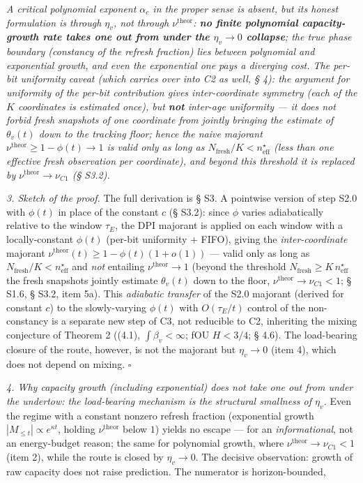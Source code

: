 \documentclass[12pt]{iopart}
\begin{document}
\emph{A critical polynomial exponent \(\alpha_c\) in the proper sense is absent, but its honest formulation is through \(\eta_v\), not through \(\nu^{\text{theor}}\): \textbf{no finite polynomial capacity-growth rate takes one out from under the \(\eta_v \to 0\) collapse}; the true phase boundary (constancy of the refresh fraction) lies between polynomial and exponential growth, and even the exponential one pays a diverging cost. The per-bit uniformity caveat (which carries over into C2 as well, § 4): the argument for uniformity of the per-bit contribution gives \emph{inter-coordinate} symmetry (each of the \(K\) coordinates is estimated once), but \textbf{not} \emph{inter-age} uniformity --- it does not forbid fresh snapshots of one coordinate from \emph{jointly} bringing the estimate of \(\theta_v(t)\) down to the tracking floor; hence the naive majorant \(\nu^{\text{theor}} \ge 1-\phi(t) \to 1\) is valid only as long as \(N_{\text{fresh}}/K < n_{\text{eff}}^\star\) (less than one effective fresh observation per coordinate), and beyond this threshold it is replaced by \(\nu^{\text{theor}} \to \nu_{C1}\) (§ S3.2).}



\emph{3. Sketch of the proof.} The full derivation is § S3. A pointwise version of step S2.0 with \(\phi(t)\) in place of the constant \(c\) (§ S3.2): since \(\phi\) varies adiabatically relative to the window \(\tau_E\), the DPI majorant is applied on each window with a locally-constant \(\phi(t)\) (per-bit uniformity + FIFO), giving the \emph{inter-coordinate} majorant \(\nu^{\text{theor}}(t) \ge 1 - \phi(t)(1+o(1))\) --- valid only as long as \(N_{\text{fresh}}/K < n_{\text{eff}}^\star\) and \emph{not} entailing \(\nu^{\text{theor}} \to 1\) (beyond the threshold \(N_{\text{fresh}} \ge K\,n_{\text{eff}}^\star\) the fresh snapshots jointly estimate \(\theta_v(t)\) down to the floor, \(\nu^{\text{theor}} \to \nu_{C1} < 1\); § S1.6, § S3.2, item 5a). This \emph{adiabatic transfer} of the S2.0 majorant (derived for constant \(c\)) to the slowly-varying \(\phi(t)\) with \(O(\tau_E/t)\) control of the non-constancy is a separate new step of C3, not reducible to C2, inheriting the mixing conjecture of Theorem 2 ((4.1), \(\int\beta_v<\infty\); fOU \(H<3/4\); § 4.6). The load-bearing closure of the route, however, is not the majorant but \(\eta_v \to 0\) (item 4), which does not depend on mixing. \(\square\)



\emph{4. Why capacity growth (including exponential) does not take one out from under the undertow: the load-bearing mechanism is the structural smallness of \(\eta_v\).} Even the regime with a constant nonzero refresh fraction (exponential growth \(|M_{\le t}| \propto e^{\kappa t}\), holding \(\nu^{\text{theor}}\) below \(1\)) yields no escape --- for an \emph{informational}, not an energy-budget reason; the same for polynomial growth, where \(\nu^{\text{theor}} \to \nu_{C1} < 1\) (item 2), while the route is closed by \(\eta_v \to 0\). The decisive observation: growth of raw capacity does not raise prediction. The numerator is horizon-bounded,
\end{document}
